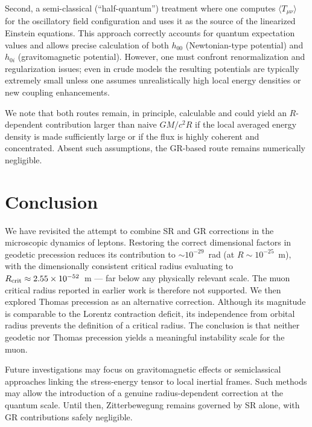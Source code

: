 \documentclass[%
 reprint,
 amsmath,amssymb,
 aps,
]{revtex4-1}
\numberwithin{equation}{section}
\begin{document}
Second, a semi-classical (``half-quantum'') treatment where one computes $\langle T_{\mu\nu}\rangle$ for the oscillatory field configuration and uses it as the source of the linearized Einstein equations. This approach correctly accounts for quantum expectation values and allows precise calculation of both $h_{00}$ (Newtonian-type potential) and $h_{0i}$ (gravitomagnetic potential). However, one must confront renormalization and regularization issues; even in crude models the resulting potentials are typically extremely small unless one assumes unrealistically high local energy densities or new coupling enhancements.

We note that both routes remain, in principle, calculable and could yield an $R$-dependent contribution larger than naive $GM/c^{2}R$ if the local averaged energy density is made sufficiently large or if the flux is highly coherent and concentrated. Absent such assumptions, the GR-based route remains numerically negligible.

\section{Conclusion}\label{sec:conclusion}

We have revisited the attempt to combine SR and GR corrections in the microscopic dynamics of leptons. Restoring the correct dimensional factors in geodetic precession reduces its contribution to $\sim 10^{-29}$~rad (at $R \sim 10^{-25}$~m), with the dimensionally consistent critical radius evaluating to $R_{\rm crit} \approx 2.55 \times 10^{-52}$~m --- far below any physically relevant scale. The muon critical radius reported in earlier work 
is therefore not supported. We then explored Thomas precession as an alternative correction. Although its magnitude is comparable to the Lorentz contraction deficit, its independence from orbital radius prevents the definition of a critical radius. The conclusion is that neither geodetic nor Thomas precession yields a meaningful instability scale for the muon. 

Future investigations may focus on gravitomagnetic effects or semiclassical approaches linking the stress-energy tensor to local inertial frames. Such methods may allow the introduction of a genuine radius-dependent correction at the quantum scale. Until then, Zitterbewegung remains governed by SR alone, with GR contributions safely negligible. 
\end{document}
